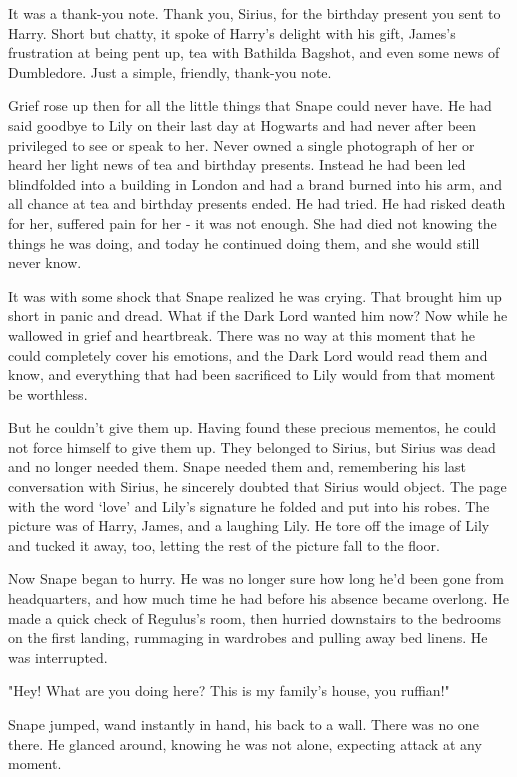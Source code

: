 It was a thank-you note. Thank you, Sirius, for the birthday present you sent to Harry. Short but chatty, it spoke of Harry's delight with his gift, James's frustration at being pent up, tea with Bathilda Bagshot, and even some news of Dumbledore. Just a simple, friendly, thank-you note.

Grief rose up then for all the little things that Snape could never have. He had said goodbye to Lily on their last day at Hogwarts and had never after been privileged to see or speak to her. Never owned a single photograph of her or heard her light news of tea and birthday presents. Instead he had been led blindfolded into a building in London and had a brand burned into his arm, and all chance at tea and birthday presents ended. He had tried. He had risked death for her, suffered pain for her - it was not enough. She had died not knowing the things he was doing, and today he continued doing them, and she would still never know.

It was with some shock that Snape realized he was crying. That brought him up short in panic and dread. What if the Dark Lord wanted him now? Now while he wallowed in grief and heartbreak. There was no way at this moment that he could completely cover his emotions, and the Dark Lord would read them and know, and everything that had been sacrificed to Lily would from that moment be worthless.

But he couldn't give them up. Having found these precious mementos, he could not force himself to give them up. They belonged to Sirius, but Sirius was dead and no longer needed them. Snape needed them and, remembering his last conversation with Sirius, he sincerely doubted that Sirius would object. The page with the word `love' and Lily's signature he folded and put into his robes. The picture was of Harry, James, and a laughing Lily. He tore off the image of Lily and tucked it away, too, letting the rest of the picture fall to the floor.

Now Snape began to hurry. He was no longer sure how long he'd been gone from headquarters, and how much time he had before his absence became overlong. He made a quick check of Regulus's room, then hurried downstairs to the bedrooms on the first landing, rummaging in wardrobes and pulling away bed linens. He was interrupted.

"Hey! What are you doing here? This is my family's house, you ruffian!"

Snape jumped, wand instantly in hand, his back to a wall. There was no one there. He glanced around, knowing he was not alone, expecting attack at any moment.

